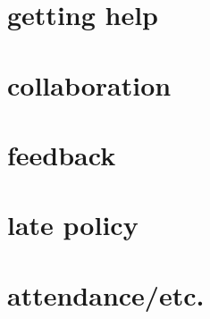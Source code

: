 \section{getting help}


\section{collaboration}


\section{feedback}


\section{late policy}


\section{attendance/etc.}

